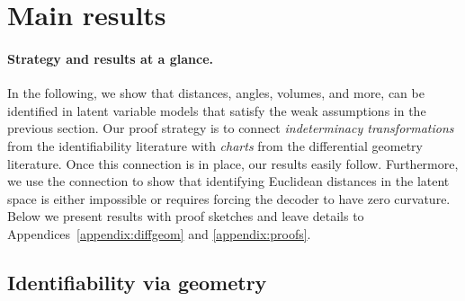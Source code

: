 \section{Main results}
\label{results}


\paragraph{Strategy and results at a glance.}
In the following, we show that distances, angles, volumes, and more, can be identified in latent variable models that satisfy the weak assumptions in the previous section. Our proof strategy is to connect \emph{indeterminacy transformations} from the identifiability literature with \emph{charts} from the differential geometry literature. Once this connection is in place, our results easily follow. Furthermore, we use the connection to show that identifying Euclidean distances in the latent space is either impossible or requires forcing the decoder to have zero curvature.
%
Below we present results with proof sketches and leave details to Appendices~\ref{appendix:diffgeom} and \ref{appendix:proofs}. 

\subsection{Identifiability via geometry}

